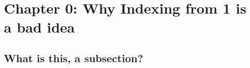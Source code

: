 \section{Chapter 0: Why Indexing from 1 is a bad idea}
\subsection{What is this, a subsection?}
\Blindtext
